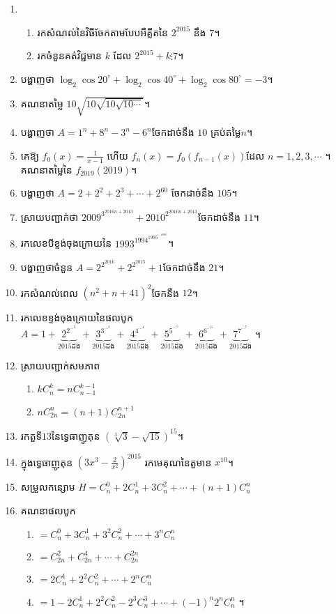 \documentclass[a4paper,12pt]{book}
\begin{document}
\begin{enumerate}[1]
\item 
\begin{enumerate}[a]
\item រកសំណល់នៃវិធីចែកតាមបែបអឺគ្លីតនៃ $2^{2015}$ នឹង $7$។
\item រកចំនួនគត់វិជ្ជមាន $k$ ដែល $2^{2015}+k \vdots 7$។
\end{enumerate}
\item បង្ហាញថា $\log_2 \cos20^{\circ}+\log_2 \cos40^{\circ}+\log_2\cos80^{\circ}=-3$។
\item គណនាតម្លៃ $10\sqrt{10\sqrt{10\sqrt{10\cdots}}}$។
\item បង្ហាញថា $A=1^n+8^n-3^n-6^n$​ ចែកដាច់នឹង $10$ គ្រប់តម្លៃ$n$។
\item គេឱ្យ $f_0(x)=\frac{1}{x-1}$ ហើយ $f_n(x)=f_0\left(f_{n-1}(x)\right)$​ដែល $n=1,2,3,\cdots$ ។​ គណនាតម្លៃនៃ $f_{2019}(2019)$។​
\item បង្ហាញថា $A=2+2^2+2^3+\cdots+2^{60}$ ចែកដាច់នឹង $105$។
\item ស្រាយបញ្ជាក់ថា $2009^{3^{2016n+2013}}+2010^{2^{2016n+2013}}$ចែកដាច់នឹង $11$។
\item រកលេខបីខ្ទង់ចុងក្រោយនៃ $1993^{1994^{1995^{\cdots^{10000}}}}$។
\item បង្ហាញថាចំនួន $A=2^{2^{2016}}+2^{2^{2015}}+1$​ ចែកដាច់នឹង $21$។
\item រកសំណល់ពេល $\left(n^2+n+41\right)^2$ចែកនឹង $12$។
\item រកលេខខ្ទង់ចុងក្រោយនៃផលបូក $A=1+\underbrace{2^{2^{\cdots^{2}}}}_{2015\text{ដង}}+\underbrace{3^{3^{\cdots^{3}}}}_{2015\text{ដង}}+\underbrace{4^{4^{\cdots^{4}}}}_{2015\text{ដង}}+\underbrace{5^{5^{\cdots^{5}}}}_{2015\text{ដង}}+\underbrace{6^{6^{\cdots^{6}}}}_{2015\text{ដង}}+\underbrace{7^{7^{\cdots^{7}}}}_{2015\text{ដង}}$ ។
\item ស្រាយបញ្ជាក់សមភាព
\begin{enumerate}[a]
\item $kC_n^k=nC_{n-1}^{k-1}$
\item $nC_{2n}^{n}=(n+1)C_{2n}^{n+1}$
\end{enumerate}
\item រកតួទី$13$នៃទ្វេធាញូតុន $\left(\sqrt[3]{3}-\sqrt{15}\right)^{15}$។
\item ក្នុងទ្វេធាញូតុន $\left(3x^3-\frac{2}{x^2}\right)^{2015}$  រកមេគុណនៃតួមាន $x^{10}$។
\item សម្រួលកន្សោម $H=C_n^0+2C_n^1+3C_n^2+\cdots+(n+1)C_n^n$
\item គណនាផលបូក
\begin{enumerate}[A]
\item $=C_n^0+3C_n^1+3^2C_n^2+\cdots+3^nC_n^n$
\item $=C_{2n}^2+C_{2n}^4+\cdots+C_{2n}^{2n}$
\item $=2C_n^1+2^2C_n^2+\cdots+2^nC_n^n$
\item $=1-2C_n^1+2^2C_n^2-2^3C_n^3+\cdots+(-1)^n2^nC_n^n$ ។
\end{enumerate}
\end{enumerate}
\end{document}
